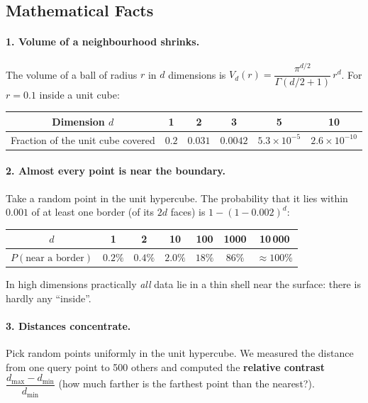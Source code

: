 \subsection{Mathematical Facts}

\paragraph{1. Volume of a neighbourhood shrinks.} The volume of a ball of radius $r$ in $d$ dimensions is $V_d(r)=\dfrac{\pi^{d/2}}{\Gamma(d/2+1)}\,r^d$. For $r=0.1$ inside a unit cube:

\begin{center}
\begin{tabular}{@{}c|ccccc@{}}
\toprule
Dimension $d$ & 1 & 2 & 3 & 5 & 10\\
\midrule
Fraction of the unit cube covered & $0.2$ & $0.031$ & $0.0042$ & $5.3\times10^{-5}$ & $2.6\times10^{-10}$\\
\bottomrule
\end{tabular}
\end{center}

\paragraph{2. Almost every point is near the boundary.} Take a random point in the unit hypercube. The probability that it lies within $0.001$ of at least one border (of its $2d$ faces) is $1-(1-0.002)^d$:

\begin{center}
\begin{tabular}{@{}c|cccccc@{}}
\toprule
$d$ & 1 & 2 & 10 & 100 & 1000 & 10\,000\\
\midrule
$P(\text{near a border})$ & $0.2\%$ & $0.4\%$ & $2.0\%$ & $18\%$ & $86\%$ & $\approx100\%$\\
\bottomrule
\end{tabular}
\end{center}

In high dimensions practically \emph{all} data lie in a thin shell near the surface: there is hardly any ``inside''.

\paragraph{3. Distances concentrate.} Pick random points uniformly in the unit hypercube. We measured the distance from one query point to 500 others and computed the \textbf{relative contrast} $\dfrac{d_{\max}-d_{\min}}{d_{\min}}$ (how much farther is the farthest point than the nearest?).

